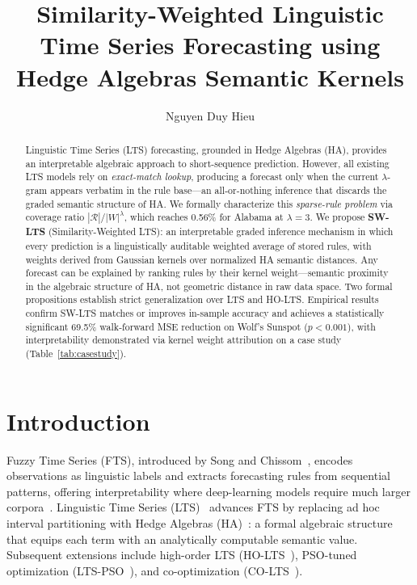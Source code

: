 \documentclass{llncs}
\begin{document}
\title{Similarity-Weighted Linguistic Time Series Forecasting
using Hedge Algebras Semantic Kernels}

\author{Nguyen Duy Hieu}

\maketitle

\begin{abstract}
Linguistic Time Series (LTS) forecasting, grounded in Hedge Algebras
(HA), provides an interpretable algebraic approach to short-sequence
prediction. However, all existing LTS models rely on
\emph{exact-match lookup}, producing a forecast only when the current
$\lambda$-gram appears verbatim in the rule base---an all-or-nothing
inference that discards the graded semantic structure of HA. We
formally characterize this \emph{sparse-rule problem} via coverage
ratio $|\mathcal{R}|/|W|^\lambda$, which reaches 0.56\% for Alabama
at $\lambda=3$. We propose \textbf{SW-LTS} (Similarity-Weighted LTS):
an interpretable graded inference mechanism in which every prediction
is a linguistically auditable weighted average of stored rules, with
weights derived from Gaussian kernels over normalized HA semantic
distances. Any forecast can be explained by ranking rules by their
kernel weight---semantic proximity in the algebraic structure of HA,
not geometric distance in raw data space. Two formal propositions
establish strict generalization over LTS and HO-LTS. Empirical
results confirm SW-LTS matches or improves in-sample accuracy and
achieves a statistically significant 69.5\% walk-forward MSE reduction
on Wolf's Sunspot ($p{<}0.001$), with interpretability demonstrated
via kernel weight attribution on a case study (Table~\ref{tab:casestudy}).
\end{abstract}


\section{Introduction}
\label{sec:intro}

Fuzzy Time Series (FTS), introduced by Song and
Chissom~\cite{song1993,song1994}, encodes observations as linguistic
labels and extracts forecasting rules from sequential patterns,
offering interpretability where deep-learning models require much
larger corpora~\cite{zhan2024dfcnn}. Linguistic Time
Series (LTS)~\cite{hieu2020lts} advances FTS by replacing ad hoc
interval partitioning with Hedge Algebras
(HA)~\cite{catho2002ha,catho2002sqm}: a formal algebraic structure
that equips each term with an analytically computable semantic value.
Subsequent extensions include high-order LTS
(HO-LTS~\cite{hieu2021holts}), PSO-tuned optimization
(LTS-PSO~\cite{hieu2022ltspso}), and co-optimization
(CO-LTS~\cite{hieu2023colts}).
\end{document}
